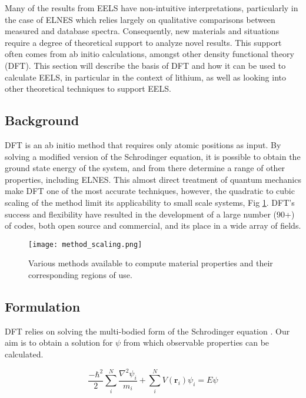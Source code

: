 

 


Many of the results from EELS have non-intuitive interpretations, particularly in the case of ELNES which relies largely on qualitative comparisons between measured and database spectra.  Consequently, new materials and situations require a degree of theoretical support to analyze novel results.  This support often comes from ab initio calculations, amongst other density functional theory (DFT).  This section will describe the basis of DFT and how it can be used to calculate EELS, in particular in the context of lithium, as well as looking into other theoretical techniques to support EELS.

\subsection{Background}
DFT is an ab initio method that requires only atomic positions as input.  By solving a modified version of the Schrodinger equation, it is possible to obtain the ground state energy of the system, and from there determine a range of other properties, including ELNES. This almost direct treatment of quantum mechanics make DFT one of the most accurate techniques, however, the quadratic to cubic scaling of the method limit its applicability to small scale systems, Fig \ref{scaling}.  DFT's success and flexibility have resulted in the development of a large number (90+) of codes, both open source and commercial, and its place in a wide array of fields.  

\begin{figure}
	\centering
	\texttt{[image: method\_scaling.png]}
	\caption{Various methods available to compute material properties and their corresponding regions of use. }
	\label{scaling}
\end{figure}


\subsection{Formulation}

DFT relies on solving the multi-bodied form of the Schrodinger equation \cite{sholl_density_2009}.  Our aim is to obtain a solution for $\psi$ from which observable properties can be calculated.  

\begin{equation}
	\frac{-\hbar^2}{2} \sum_{i}^{N} \frac{\nabla^2 \psi_i}{m_i} + \sum_{i}^{N} V(\textbf{r}_i) \psi_i = E \psi
\end{equation}

